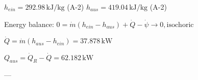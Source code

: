 \( h_{ein} = 292.98 \, \text{kJ/kg} \) (A-2)  
\( h_{aus} = 419.04 \, \text{kJ/kg} \) (A-2)  

Energy balance:  
\( 0 = \dot{m} (h_{ein} - h_{aus}) + \dot{Q} - \dot{\psi} \rightarrow 0, \text{isochoric} \)  

\( \dot{Q} = \dot{m} (h_{aus} - h_{ein}) = 37.878 \, \text{kW} \)  

\( Q_{aus} = \dot{Q}_R - \dot{Q} = 62.182 \, \text{kW} \)  

---